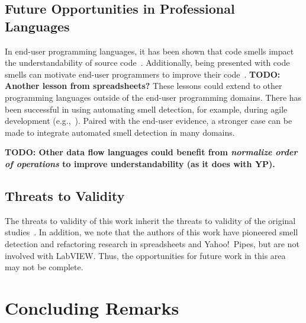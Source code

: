 \documentclass[10pt,conference,compsocconf]{IEEEtran}
\newcommand{\todo}[1]{\textbf{TODO: #1}}
\begin{document}
\subsection{Future Opportunities in Professional Languages}
In end-user programming languages, it has been shown that code smells impact the understandability of
source code~\cite{StoleeTSE2013}. Additionally, being presented with code smells can motivate end-user programmers to improve their code~\cite{chambers2013smell}. 
\todo{Another lesson from spreadsheets?}
These lessons could extend to other programming languages outside of the end-user programming domains. There has been successful in using automating smell detection, for example, during agile development (e.g.,~\cite{Schumacher:2010:BES:1852786.1852797}). Paired with the end-user evidence, a stronger case can be made to integrate automated smell detection in many domains. 

\todo{Other data flow languages could benefit from \emph{normalize order of operations} to improve understandability (as it does with YP). }

\subsection{Threats to Validity}
The threats to validity of this work inherit the threats to validity of the original studies~\cite{Stolee2015, Stolee2011, StoleeTSE2013, Hermans2011, Hermans2012intra, Hermans2012inter, hermans2014bumblebee, chambers2013smell, chambers2015impact, badame2012refactoring}. In addition, we note that the authors of this work have pioneered smell detection and refactoring research in spreadsheets and Yahoo!\ Pipes, but are not involved with LabVIEW. Thus, the opportunities for future work in this area may not be complete.  

\section{Concluding Remarks}
\label{sec:conclusions}

\newpage
\balance





\end{document}
